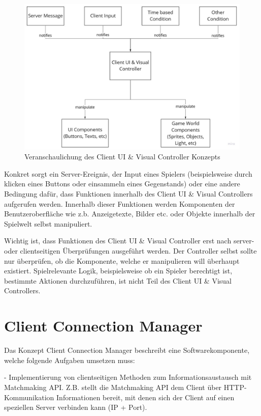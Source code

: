 \begin{figure}
	\centering
	\includegraphics[width=150mm]{images/Client_UI_und_Visual_Konzept.jpg}
	\caption[Client UI \& Visual Controller Diagramm]{Veranschaulichung des Client UI \& Visual Controller Konzepts}
	\label{pic:Client_UI_und_Visual_Konzept}
\end{figure}

Konkret sorgt ein Server-Ereignis, der Input eines Spielers (beispielsweise durch klicken eines Buttons oder einsammeln eines Gegenstands) oder eine andere Bedingung dafür, dass Funktionen innerhalb des Client UI \& Visual Controllers aufgerufen werden. Innerhalb dieser Funktionen werden Komponenten der Benutzeroberfläche wie z.b. Anzeigetexte, Bilder etc. oder Objekte innerhalb der Spielwelt selbst manipuliert.

Wichtig ist, dass Funktionen des Client UI \& Visual Controller erst nach server- oder clientseitigen Überprüfungen ausgeführt werden. Der Controller selbst sollte nur überprüfen, ob die Komponente, welche er manipulieren will überhaupt existiert. Spielrelevante Logik, beispielsweise ob ein Spieler berechtigt ist, bestimmte Aktionen durchzuführen, ist nicht Teil des Client UI \& Visual Controllers.

\section{Client Connection Manager}

Das Konzept Client Connection Manager beschreibt eine Softwarekomponente, welche folgende Aufgaben umsetzen muss:

- Implementierung von clientseitigen Methoden zum Informationsaustausch mit Matchmaking API.
Z.B. stellt die Matchmaking API dem Client über HTTP-Kommunikation Informationen bereit, mit denen sich der Client auf einen speziellen Server verbinden kann (IP + Port). \cite{Wikipedia.2021d} \cite{Wikipedia.2021e}

